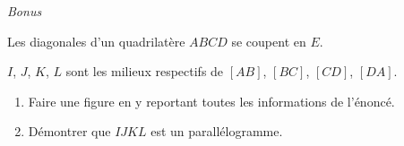 \documentclass[a4paper,12pt,twocolumn,landscape]{article}
\newcommand{\Fin}{node[xshift=-1.5ex,rotate=10]{F}
node[rotate=170]{i}
node[xshift=1.5ex,rotate=45]{n}}
\begin{document}
\begin{minipage}{0.45\textwidth}
\vspace*{1em}

\begin{center}
\end{center}

\vspace*{2em}

\hrulefill
\exercice\hfill \emph{Bonus}

Les diagonales d’un quadrilatère $ABCD$ se coupent en $E$.

$I$, $J$, $K$, $L$ sont les milieux respectifs de $[AB]$, $[BC]$, $[CD]$, $[DA]$.

\begin{enumerate}
	\item Faire une figure en y reportant toutes les informations de l’énoncé.
	\item Démontrer que $IJKL$ est un parallélogramme.
\end{enumerate}


\end{minipage}
\end{document}
